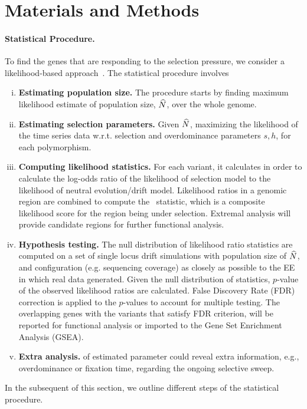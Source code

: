 \section{Materials and Methods}
\label{sec:method}

\paragraph{Statistical Procedure.}
To find the genes that are responding to the selection pressure, we
consider a likelihood-based
approach~\cite{bollback2008estimation, 
vitti2013detecting,nielsen2005genomic,topa2015gaussian,Terhorst2015Multi}.
The statistical procedure involves
\begin{enumerate}[(i)]
	\item  {\bf Estimating population size.} The procedure starts by 
	finding 
	maximum likelihood estimate of population size, 
	$\widehat{N}$, over the whole genome.
	\item {\bf Estimating selection parameters.} Given $\widehat{N}$, 
	maximizing the 
	likelihood of the time series data w.r.t. 
	selection and overdominance parameters $s,h$, for each	
	polymorphism.
	\item {\bf Computing likelihood statistics.} For each variant, it 
	calculates in order to calculate the log-odds 
	ratio of the likelihood of selection model to the likelihood of neutral
	evolution/drift model. Likelihood ratios in a genomic region
	are combined to compute the \comale\ statistic, which is a composite
	likelihood score for the region being under selection. Extremal analysis 
	will provide candidate regions for further functional analysis.
	\item {\bf Hypothesis testing.} The null distribution of likelihood 
	ratio 
	statistics are computed on 
	a set of single locus drift simulations with population size of $\widehat{N}$, and 
	configuration (e.g. sequencing coverage) as closely as possible to the EE 
	in which real data generated. Given the null distribution of statistics, 
	$p$-value of the observed likelihood ratios are calculated.
	False Discovery Rate (FDR) correction is applied to the $p$-values 
	to 
	account for multiple testing. The overlapping genes with the 
	variants that 
	satisfy FDR criterion, 
	will be reported for functional analysis or imported to the Gene Set 
	Enrichment Analysis (GSEA).
	\item {\bf Extra analysis.} of estimated parameter could reveal 
	extra 
	information, e.g., overdominance or fixation time, regarding the ongoing 
	selective sweep.
\end{enumerate}
In the subsequent of this section, we outline different steps of the 
statistical procedure.
